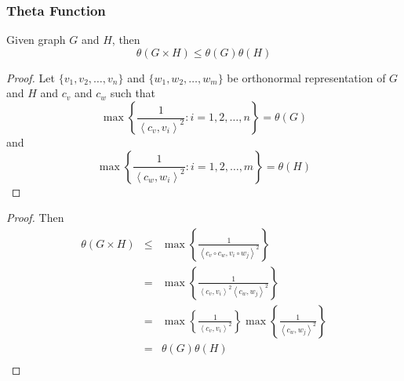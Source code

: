 \documentclass{beamer}
\begin{document}
                  \begin{frame}
                        \frametitle{Theta Function}
                        \begin{lemma}
                              Given graph $ G $ and $ H $, then
                              \begin{equation}
                                    \theta(G \times H) \leq \theta(G) \theta(H)
                              \end{equation}
                        \end{lemma}

                        \pause

                        \begin{proof}
                              Let $ \{v_1, v_2, \dots, v_n\} $ and $ \{w_1, w_2, \dots, w_m\} $ be orthonormal representation of $ G $ and $ H $ and $ c_{v} $ and $ c_{w} $ such that
                              \begin{equation}
                                    \max \left\{ \frac{1}{\left<c_{v},v_{i}\right>^2} : i=1,2,\dots,n \right\} = \theta(G)
                              \end{equation} 
                              and 
                              \begin{equation}
                                    \max \left\{ \frac{1}{\left<c_{w},w_{i}\right>^2} : i=1,2,\dots,m \right\} = \theta(H)
                              \end{equation}
                        \end{proof}
                  \end{frame}

                  \begin{frame}
                        \begin{proof}
                              Then
                              \begin{eqnarray}
                                    \theta(G \times H) &\leq& 
                                    \max \left\{ \frac{1}{\left<c_{v} \circ c_{w},v_{i} \circ w_{j}\right>^2} \right\} \\
                                    &=& \max \left\{ \frac{1}{\left<c_{v},v_{i}\right>^2 \left<c_{w},w_{j}\right>^2} \right\} \\
                                    &=& \max \left\{ \frac{1}{\left<c_{v},v_{i}\right>^2} \right\} \max \left\{ \frac{1}{\left<c_{w},w_{j}\right>^2} \right\} \\
                                    &=& \theta(G) \theta(H) \\
                              \end{eqnarray}
                        \end{proof}
                  \end{frame}
\end{document}
